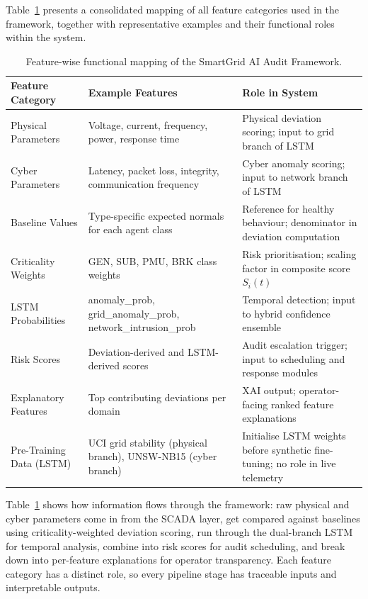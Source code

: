 Table~\ref{tab:feature_mapping} presents a consolidated mapping of all feature categories used in the framework, together with representative examples and their functional roles within the system.

\begin{table}[H]
\centering
\caption{Feature-wise functional mapping of the SmartGrid AI Audit Framework.}
\label{tab:feature_mapping}
\renewcommand{\arraystretch}{1.3}
\begin{tabularx}{\textwidth}{|l|X|X|}
\hline
\textbf{Feature Category} & \textbf{Example Features} & \textbf{Role in System} \\
\hline
Physical Parameters & Voltage, current, frequency, power, response time & Physical deviation scoring; input to grid branch of LSTM \\
\hline
Cyber Parameters & Latency, packet loss, integrity, communication frequency & Cyber anomaly scoring; input to network branch of LSTM \\
\hline
Baseline Values & Type-specific expected normals for each agent class & Reference for healthy behaviour; denominator in deviation computation \\
\hline
Criticality Weights & GEN, SUB, PMU, BRK class weights & Risk prioritisation; scaling factor in composite score $S_i(t)$ \\
\hline
LSTM Probabilities & anomaly\_prob, grid\_anomaly\_prob, network\_intrusion\_prob & Temporal detection; input to hybrid confidence ensemble \\
\hline
Risk Scores & Deviation-derived and LSTM-derived scores & Audit escalation trigger; input to scheduling and response modules \\
\hline
Explanatory Features & Top contributing deviations per domain & XAI output; operator-facing ranked feature explanations \\
\hline
Pre-Training Data (LSTM) & UCI grid stability (physical branch), UNSW-NB15 (cyber branch) & Initialise LSTM weights before synthetic fine-tuning; no role in live telemetry \\
\hline
\end{tabularx}
\end{table}

\par \vspace{0.35cm}
\noindent
Table~\ref{tab:feature_mapping} shows how information flows through the framework: raw physical and cyber parameters come in from the SCADA layer, get compared against baselines using criticality-weighted deviation scoring, run through the dual-branch LSTM for temporal analysis, combine into risk scores for audit scheduling, and break down into per-feature explanations for operator transparency. Each feature category has a distinct role, so every pipeline stage has traceable inputs and interpretable outputs.
